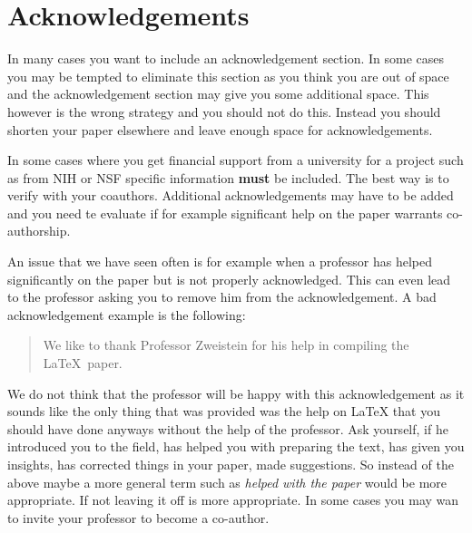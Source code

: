 \FILENAME

\section{Acknowledgements}
\label{S:acknowledgements}

In many cases you want to include an acknowledgement section. In some
cases you may be tempted to eliminate this section as you think you
are out of space and the acknowledgement section may give you some
additional space. This however is the wrong strategy and you should
not do this. Instead you should shorten your paper elsewhere and leave
enough space for acknowledgements.

In some cases where you get financial support from a university for a
project such as from NIH or NSF specific information {\bf must} be
included. The best way is to verify with your coauthors. Additional
acknowledgements may have to be added and you need te evaluate if for
example significant help on the paper warrants co-authorship.

An issue that we have seen often is for example when a professor has
helped significantly on the paper but is not properly acknowledged.
This can even lead to the professor asking you to remove him from the
acknowledgement. A bad acknowledgement example is the following:

\begin{quote} 

  We like to thank Professor Zweistein for his help in
  compiling the \LaTeX~paper. 

\end{quote}

We do not think that the professor will be happy with this
acknowledgement as it sounds like the only thing that was provided was
the help on LaTeX that you should have done anyways without the help
of the professor. Ask yourself, if he introduced you to the field, has
helped you with preparing the text, has given you insights, has
corrected things in your paper, made suggestions. So instead of the
above maybe a more general term such as \textit{helped with the paper}
would be more appropriate. If not leaving it off is more appropriate.
In some cases you may wan to invite your professor to become a
co-author.
